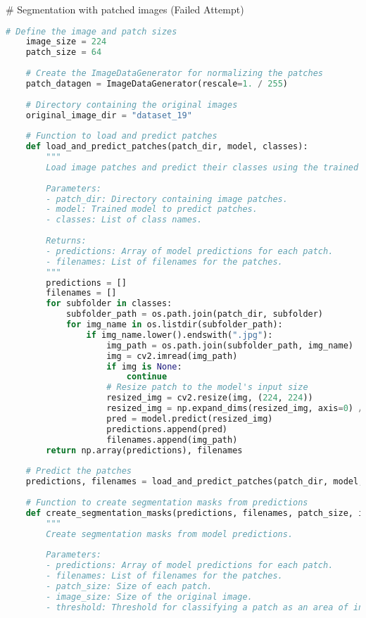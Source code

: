 # Segmentation with patched images (Failed Attempt)
\begin{lstlisting}[language=Python]
    # Define the image and patch sizes
    image_size = 224
    patch_size = 64
    
    # Create the ImageDataGenerator for normalizing the patches
    patch_datagen = ImageDataGenerator(rescale=1. / 255)
    
    # Directory containing the original images
    original_image_dir = "dataset_19"
    
    # Function to load and predict patches
    def load_and_predict_patches(patch_dir, model, classes):
        """
        Load image patches and predict their classes using the trained model.
    
        Parameters:
        - patch_dir: Directory containing image patches.
        - model: Trained model to predict patches.
        - classes: List of class names.
    
        Returns:
        - predictions: Array of model predictions for each patch.
        - filenames: List of filenames for the patches.
        """
        predictions = []
        filenames = []
        for subfolder in classes:
            subfolder_path = os.path.join(patch_dir, subfolder)
            for img_name in os.listdir(subfolder_path):
                if img_name.lower().endswith(".jpg"):
                    img_path = os.path.join(subfolder_path, img_name)
                    img = cv2.imread(img_path)
                    if img is None:
                        continue
                    # Resize patch to the model's input size
                    resized_img = cv2.resize(img, (224, 224))
                    resized_img = np.expand_dims(resized_img, axis=0) / 255.0
                    pred = model.predict(resized_img)
                    predictions.append(pred)
                    filenames.append(img_path)
        return np.array(predictions), filenames
    
    # Predict the patches
    predictions, filenames = load_and_predict_patches(patch_dir, model, classes)
    
    # Function to create segmentation masks from predictions
    def create_segmentation_masks(predictions, filenames, patch_size, image_size, threshold=0.5):
        """
        Create segmentation masks from model predictions.
    
        Parameters:
        - predictions: Array of model predictions for each patch.
        - filenames: List of filenames for the patches.
        - patch_size: Size of each patch.
        - image_size: Size of the original image.
        - threshold: Threshold for classifying a patch as an area of interest.
    

\end{lstlisting}
